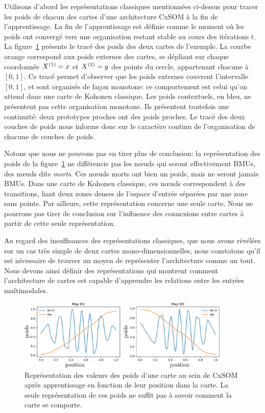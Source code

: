\documentclass[../main]{subfiles}
\begin{document}
Utilisons d'abord les représentations classiques mentionnées ci-dessus pour tracer les poids de chacun des cartes d'une architecture CxSOM à la fin de l'apprentissage.
La fin de l'apprentissage est définie comme le moment où les poids ont convergé vers une organisation restant stable au cours des itérations $t$.
La figure~\ref{fig:weights} présente le tracé des poids des deux cartes de l'exemple.
La courbe orange correspond aux poids externes des cartes, se dépliant sur chaque coordonnée $X^{({1})} = x$ et $X^{({2})} = y$ des points du cercle, appartenant chacune à $[0,1]$.
Ce tracé permet d'observer que les poids externes couvrent l'intervalle $[0,1]$, et sont organisés de façon monotone: ce comportement est celui qu'on attend dans une carte de Kohonen classique. Les poids contextuels, en bleu, ne présentent pas cette organisation monotone. Ils présentent toutefois une continuité: deux prototypes proches ont des poids proches. Le tracé des deux couches de poids nous informe donc sur le caractère continu de l'organisation de chacune de couches de poids. 

Notons que nous ne pouvons pas en tirer plus de conclusion: la représentation des poids de la figure~\ref{fig:weights} ne différencie pas les n\oe{}uds qui seront effectivement BMUs, des n\oe{}uds dits \emph{morts}.
Ces n\oe{}uds morts ont bien un poids, mais ne seront jamais BMUs.
Dans une carte de Kohonen classique, ces n\oe{}uds correspondent à des transitions, liant deux zones denses de l'espace d'entrée séparées par une zone sans points.
Par ailleurs, cette représentation concerne une seule carte. Nous ne pourrons pas tirer de conclusion sur l'influence des connexions entre cartes à partir de cette seule représentation.

Au regard des insuffisances des représentations classiques, que nous avons révélées sur un cas très simple de deux cartes mono-dimensionnelles, nous constatons qu'il est nécessaire de trouver un moyen de représenter l'architecture comme un tout. Nous devons ainsi définir des représentations qui montrent comment l'architecture de cartes est capable d'apprendre les relations entre les entrées multimodales.

\begin{figure}
\centering
\includegraphics[width=0.9\textwidth]{weights_cercle1.pdf}

\caption{Représentation des valeurs des poids d'une carte au sein de CxSOM après apprentissage en fonction de leur position dans la carte. La seule représentation de ces poids ne suffit pas à savoir comment la carte se comporte.\label{fig:weights}}
\end{figure}
\end{document}
